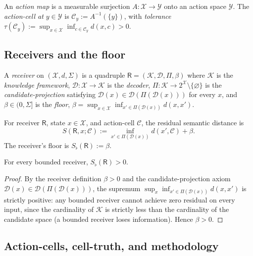 \documentclass[11pt,twocolumn,a4paper]{article}
\newcommand{\K}{\mathcal{K}}
\newcommand{\D}{\mathcal{D}}
\newcommand{\X}{\mathcal{X}}
\newcommand{\Y}{\mathcal{Y}}
\newcommand{\Cell}{\mathcal{C}}
\newcommand{\receiver}{\mathsf{R}}
\newcommand{\Sfloor}{S_{\flat}}
\begin{document}
\begin{definition}\label{def:action}
An \emph{action map} is a measurable surjection $A: \X \to \Y$ onto an action space
$\Y$. The \emph{action-cell at $y \in \Y$} is $\Cell_y := A^{-1}(\{y\})$, with
\emph{tolerance} $\tau(\Cell_y) := \sup_{x \in \X} \inf_{c \in \Cell_y} d(x, c) > 0$.
\end{definition}

\subsection{Receivers and the floor}

\begin{definition}[Receiver]\label{def:receiver}
A \emph{receiver} on $(\X, d, \Sigma)$ is a quadruple $\receiver = (\K, \D, \Pi, \beta)$
where $\K$ is the \emph{knowledge framework}, $\D: \X \to \K$ is the \emph{decoder},
$\Pi: \K \to 2^\X \setminus \{\varnothing\}$ is the \emph{candidate-projection}
satisfying $\D(x) \in \D(\Pi(\D(x)))$ for every $x$, and $\beta \in (0, \Sigma]$ is the
\emph{floor}, $\beta = \sup_{x \in \X} \inf_{x' \in \Pi(\D(x))} d(x, x')$.
\end{definition}

\begin{definition}[$S$-functional]\label{def:S}
For receiver $\receiver$, state $x \in \X$, and action-cell $\Cell$, the residual
semantic distance is
\[
S(\receiver, x; \Cell) := \inf_{x' \in \Pi(\D(x))} d(x', \Cell) + \beta.
\]
The receiver's floor is $\Sfloor(\receiver) := \beta$.
\end{definition}

\begin{theorem}\label{thm:floor}
For every bounded receiver, $\Sfloor(\receiver) > 0$.
\end{theorem}

\begin{proof}
By the receiver definition $\beta > 0$ and the candidate-projection axiom
$\D(x) \in \D(\Pi(\D(x)))$, the supremum $\sup_x \inf_{x' \in \Pi(\D(x))} d(x, x')$ is
strictly positive: any bounded receiver cannot achieve zero residual on every input,
since the cardinality of $\K$ is strictly less than the cardinality of the candidate
space (a bounded receiver loses information). Hence $\beta > 0$.
\end{proof}

\subsection{Action-cells, cell-truth, and methodology}
\end{document}
